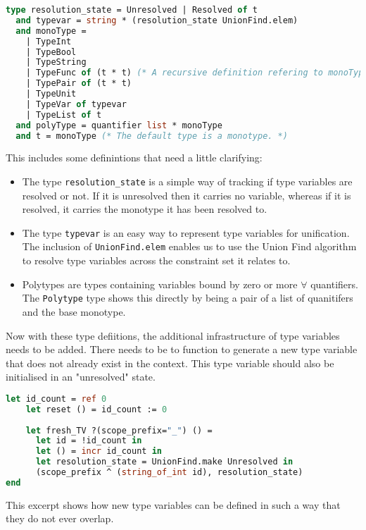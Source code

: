 \documentclass{l4proj}
\begin{document}
\begin{lstlisting}[language=Caml]
  type resolution_state = Unresolved | Resolved of t
  and typevar = string * (resolution_state UnionFind.elem)
  and monoType = 
    | TypeInt
    | TypeBool
    | TypeString
    | TypeFunc of (t * t) (* A recursive definition refering to monoType. *)
    | TypePair of (t * t)
    | TypeUnit
    | TypeVar of typevar
    | TypeList of t
  and polyType = quantifier list * monoType
  and t = monoType (* The default type is a monotype. *)
\end{lstlisting}

This includes some definintions that need a little clarifying:
\begin{itemize}
    \item The type \texttt{resolution\_state} is a simple way of tracking if type variables are resolved or not.
    If it is unresolved then it carries no variable, whereas if it is resolved, it carries the monotype it has been resolved to.
    \item The type \texttt{typevar} is an easy way to represent type variables for unification.
    The inclusion of \texttt{UnionFind.elem} enables us to use the Union Find algorithm to resolve type variables across the constraint set it relates to.
    \item Polytypes are types containing variables bound by zero or more $\forall$ quantifiers. 
    The \texttt{Polytype} type shows this directly by being a pair of a list of quanitifers and the base monotype.
\end{itemize}

Now with these type defiitions, the additional infrastructure of type variables needs to be added.
There needs to be to function to generate a new type variable that does not already exist in the context.
This type variable should also be initialised in an "unresolved" state.

\begin{lstlisting}[language=Caml, caption=The simple implementation of type variables. The fresh\_TV function generates a new\, unresolved type variable.]
    let id_count = ref 0
    let reset () = id_count := 0
    
    let fresh_TV ?(scope_prefix="_") () =
      let id = !id_count in
      let () = incr id_count in
      let resolution_state = UnionFind.make Unresolved in
      (scope_prefix ^ (string_of_int id), resolution_state)
end
\end{lstlisting}

This excerpt shows how new type variables can be defined in such a way that they do not ever overlap.
\end{document}
